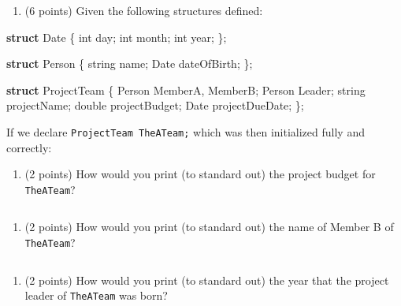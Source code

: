 \documentclass[
]{article}
\newenvironment{Shaded}{}{}
\newcommand{\DataTypeTok}[1]{\textcolor[rgb]{0.56,0.13,0.00}{#1}}
\newcommand{\KeywordTok}[1]{\textcolor[rgb]{0.00,0.44,0.13}{\textbf{#1}}}
\newcommand{\NormalTok}[1]{#1}
\providecommand{\tightlist}{%
  \setlength{\itemsep}{0pt}\setlength{\parskip}{0pt}}
\begin{document}
\pagebreak

\begin{enumerate}
\def\labelenumi{\arabic{enumi}.}
\setcounter{enumi}{1}
\tightlist
\item
  (6 points) Given the following structures defined:
\end{enumerate}

\begin{Shaded}
\begin{Highlighting}[]
\KeywordTok{struct}\NormalTok{ Date \{}
   \DataTypeTok{int}\NormalTok{ day;}
   \DataTypeTok{int}\NormalTok{ month;}
   \DataTypeTok{int}\NormalTok{ year;}
\NormalTok{\};}

\KeywordTok{struct}\NormalTok{ Person \{}
\NormalTok{   string name;}
\NormalTok{   Date dateOfBirth;}
\NormalTok{\};}

\KeywordTok{struct}\NormalTok{ ProjectTeam \{}
\NormalTok{   Person MemberA, MemberB;}
\NormalTok{   Person Leader;}
\NormalTok{   string projectName;}
   \DataTypeTok{double}\NormalTok{ projectBudget;}
\NormalTok{   Date projectDueDate;}
\NormalTok{\};}
\end{Highlighting}
\end{Shaded}

If we declare \texttt{ProjectTeam\ TheATeam;} which was then initialized
fully and correctly:

\begin{enumerate}
\def\labelenumi{\alph{enumi}.}
\tightlist
\item
  (2 points) How would you print (to standard out) the project budget
  for \texttt{TheATeam}?
\end{enumerate}

\begin{verbatim}
\end{verbatim}

\begin{enumerate}
\def\labelenumi{\alph{enumi}.}
\setcounter{enumi}{1}
\tightlist
\item
  (2 points) How would you print (to standard out) the name of Member B
  of \texttt{TheATeam}?
\end{enumerate}

\begin{verbatim}
\end{verbatim}

\begin{enumerate}
\def\labelenumi{\alph{enumi}.}
\setcounter{enumi}{2}
\tightlist
\item
  (2 points) How would you print (to standard out) the year that the
  project leader of \texttt{TheATeam} was born?
\end{enumerate}
\end{document}

